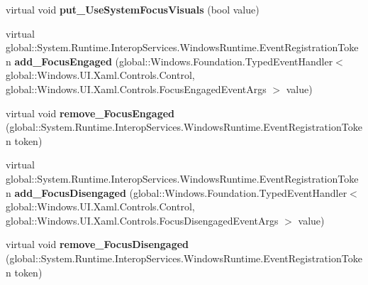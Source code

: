 \begin{DoxyCompactItemize}
\item 
\mbox{\label{class_windows_1_1_u_i_1_1_xaml_1_1_controls_1_1_control_a47ca9e1b055dc27a0c37edbc47e2540d}} 
virtual void {\bfseries put\+\_\+\+Use\+System\+Focus\+Visuals} (bool value)
\item 
\mbox{\label{class_windows_1_1_u_i_1_1_xaml_1_1_controls_1_1_control_a25b5c6642d47212aa2e63ff6200ac1c7}} 
virtual global\+::\+System.\+Runtime.\+Interop\+Services.\+Windows\+Runtime.\+Event\+Registration\+Token {\bfseries add\+\_\+\+Focus\+Engaged} (global\+::\+Windows.\+Foundation.\+Typed\+Event\+Handler$<$ global\+::\+Windows.\+U\+I.\+Xaml.\+Controls.\+Control, global\+::\+Windows.\+U\+I.\+Xaml.\+Controls.\+Focus\+Engaged\+Event\+Args $>$ value)
\item 
\mbox{\label{class_windows_1_1_u_i_1_1_xaml_1_1_controls_1_1_control_aae2dfe22e085e480a19bdb599b17d9bb}} 
virtual void {\bfseries remove\+\_\+\+Focus\+Engaged} (global\+::\+System.\+Runtime.\+Interop\+Services.\+Windows\+Runtime.\+Event\+Registration\+Token token)
\item 
\mbox{\label{class_windows_1_1_u_i_1_1_xaml_1_1_controls_1_1_control_a37520b52e70f32ebd8cf57ee3b584dcf}} 
virtual global\+::\+System.\+Runtime.\+Interop\+Services.\+Windows\+Runtime.\+Event\+Registration\+Token {\bfseries add\+\_\+\+Focus\+Disengaged} (global\+::\+Windows.\+Foundation.\+Typed\+Event\+Handler$<$ global\+::\+Windows.\+U\+I.\+Xaml.\+Controls.\+Control, global\+::\+Windows.\+U\+I.\+Xaml.\+Controls.\+Focus\+Disengaged\+Event\+Args $>$ value)
\item 
\mbox{\label{class_windows_1_1_u_i_1_1_xaml_1_1_controls_1_1_control_a8242a4de1e17e601516c00e9e14f7415}} 
virtual void {\bfseries remove\+\_\+\+Focus\+Disengaged} (global\+::\+System.\+Runtime.\+Interop\+Services.\+Windows\+Runtime.\+Event\+Registration\+Token token)
\item 
\mbox{\label{class_windows_1_1_u_i_1_1_xaml_1_1_controls_1_1_control_ac6f409bd00a64ebd932806d0bd90b1cf}} 

\end{DoxyCompactItemize}
